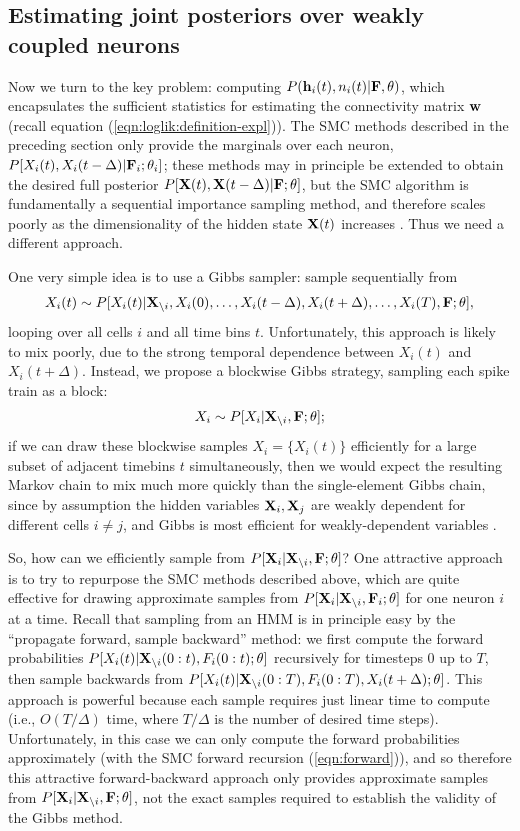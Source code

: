 \subsection{Estimating joint posteriors over weakly coupled neurons}
\label{sec:methods:joint}

Now we turn to the key problem: computing $P(\mathbf{h}_i(t),n_i(t) |
{\bf F},\theta)$, which encapsulates the sufficient statistics for
estimating the connectivity matrix $\mathbf{w}$ (recall equation
(\ref{eqn:loglik:definition-expl})). The SMC methods described in the
preceding section only provide the marginals over each neuron,
$P[X_i(t), X_i(t-\Delta) | {\bf F}_i; \mathbf{\theta}_i]$; these methods may in
principle be extended to obtain the desired full posterior $P[{\bf X}(t),
{\bf X}(t-\Delta) | {\bf F}; \mathbf{\theta}]$, but the SMC algorithm is fundamentally a
sequential importance sampling method, and therefore scales poorly as
the dimensionality of the hidden state ${\bf X}(t)$ increases
\cite{BickelBengtsson08}. Thus we need a different approach.

One very simple idea is to use a Gibbs sampler: sample sequentially
from
\begin{align}
X_i(t) \sim P[X_i(t) | \bX_{\i}, X_i(0), \ldots, X_i(t-\Delta),
 X_i(t+\Delta), \ldots, X_i(T), \bF; \bth],
\end{align} 
looping over all cells $i$ and all time bins $t$.  Unfortunately, this
approach is likely to mix poorly, due to the strong temporal
dependence between $X_i(t)$ and $X_i(t+\Delta)$.  Instead, we propose
a blockwise Gibbs strategy, sampling each spike train as a block:
\begin{align}
	X_i \sim P[X_i | \bX_{\i}, \bF; \bth];
\end{align} 
if we can draw these blockwise samples $X_i = \{X_i(t)\}$ efficiently
for a large subset of adjacent timebins $t$ simultaneously, then we
would expect the resulting Markov chain to mix much more quickly than
the single-element Gibbs chain, since by assumption the hidden
variables ${\bf X}_i,{\bf X}_j$ are weakly dependent for different cells $i
\neq j$, and Gibbs is most efficient for weakly-dependent variables
\cite{RC05}.

So, how can we efficiently sample from $P[{\bf X}_i | {\bf X}_{\backslash i}, {\bf F};
\mathbf{\theta}]$?  One attractive approach is to try to repurpose the SMC
methods described above, which are quite effective for drawing
approximate samples from $P[{\bf X}_i | {\bf X}_{\backslash i}, {\bf F}_i; \mathbf{\theta}]$ for one
neuron $i$ at a time.  Recall that sampling from an HMM is in
principle easy by the ``propagate forward, sample backward'' method:
we first compute the forward probabilities $P[X_i(t) | {\bf X}_{\backslash i}(0:t),
F_i(0:t); \mathbf{\theta}]$ recursively for timesteps $0$ up to $T$, then sample
backwards from $P[X_i(t) | {\bf X}_{\backslash i}(0:T), F_i(0:T), X_i(t+\Delta);
\mathbf{\theta}]$. This approach is powerful because each sample requires just
linear time to compute (i.e., $O(T/\Delta)$ time, where $T/\Delta$ is
the number of desired time steps). Unfortunately, in this case we can
only compute the forward probabilities approximately (with the SMC
forward recursion (\ref{eqn:forward})), and so therefore this
attractive forward-backward approach only provides approximate samples
from $P[{\bf X}_i | {\bf X}_{\backslash i}, {\bf F}; \mathbf{\theta}]$, not the exact samples required
to establish the validity of the Gibbs method.


